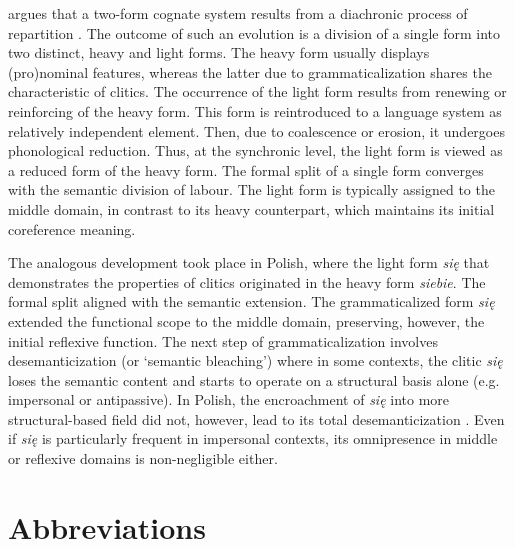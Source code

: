 \documentclass[output=paper]{langscibook}
\begin{document}
\citet{Kemmer1993}  argues that a two-form cognate system results from a diachronic process of repartition \citep{Bréal1897}. The outcome of such an evolution is a division of a single form into two distinct, heavy and light forms. The heavy form usually displays (pro)nominal features, whereas the latter due to grammaticalization shares the characteristic of clitics. The occurrence of the light form results from renewing or reinforcing of the heavy form. This form is reintroduced to a language system as relatively independent element. Then, due to coalescence or erosion, it undergoes phonological reduction. Thus, at the synchronic level, the light form is viewed as a reduced form of the heavy form. The formal split of a single form converges with the semantic division of labour. The light form is typically assigned to the middle domain, in contrast to its heavy counterpart, which maintains its initial coreference meaning.

The analogous development took place in Polish, where the light form \textit{się} that demonstrates the properties of clitics originated in the heavy form \textit{siebie}. The formal split aligned with the semantic extension. The grammaticalized form \textit{się} extended the functional scope to the middle domain, preserving, however, the initial reflexive function. The next step of grammaticalization involves desemanticization (or ‘semantic bleaching’) where in some contexts, the clitic \textit{się} loses the semantic content and starts to operate on a structural basis alone (e.g. impersonal or antipassive). In Polish, the encroachment of \textit{się} into more structural-based field did not, however, lead to its total desemanticization \citep{Heine1999}. Even if \textit{się} is particularly frequent in impersonal contexts, its omnipresence in middle or reflexive domains is non-negligible either.

 
 
\section*{Abbreviations}

{\sloppy\printbibliography[heading=subbibliography,notkeyword=this]}
\end{document}
